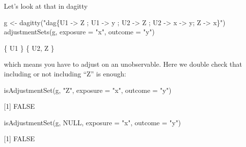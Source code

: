 \documentclass[
  11pt,
  ignorenonframetext,
]{beamer}
\newenvironment{Shaded}{\begin{snugshade}}{\end{snugshade}}
\newcommand{\AttributeTok}[1]{\textcolor[rgb]{0.40,0.45,0.13}{#1}}
\newcommand{\ConstantTok}[1]{\textcolor[rgb]{0.56,0.35,0.01}{#1}}
\newcommand{\FunctionTok}[1]{\textcolor[rgb]{0.28,0.35,0.67}{#1}}
\newcommand{\NormalTok}[1]{\textcolor[rgb]{0.00,0.23,0.31}{#1}}
\newcommand{\OtherTok}[1]{\textcolor[rgb]{0.00,0.23,0.31}{#1}}
\newcommand{\StringTok}[1]{\textcolor[rgb]{0.13,0.47,0.30}{#1}}
\begin{document}
\begin{frame}[fragile]{Let's look at that in dagitty}
\protect\hypertarget{lets-look-at-that-in-dagitty-1}{}
\begin{Shaded}
\begin{Highlighting}[]
\NormalTok{g }\OtherTok{\textless{}{-}} \FunctionTok{dagitty}\NormalTok{(}\StringTok{"dag\{U1 {-}\textgreater{} Z  ; U1 {-}\textgreater{} y ; }
\StringTok{             U2 {-}\textgreater{} Z ; U2 {-}\textgreater{} x  {-}\textgreater{} y; }
\StringTok{             Z {-}\textgreater{} x\}"}\NormalTok{)}
\FunctionTok{adjustmentSets}\NormalTok{(g, }\AttributeTok{exposure =} \StringTok{"x"}\NormalTok{, }\AttributeTok{outcome =} \StringTok{"y"}\NormalTok{)}
\end{Highlighting}
\end{Shaded}

\{ U1 \} \{ U2, Z \}

which means you have to adjust on an unobservable. Here we double check
that including or not including ``Z'' is enough:

\begin{Shaded}
\begin{Highlighting}[]
\FunctionTok{isAdjustmentSet}\NormalTok{(g, }\StringTok{"Z"}\NormalTok{, }\AttributeTok{exposure =} \StringTok{"x"}\NormalTok{, }\AttributeTok{outcome =} \StringTok{"y"}\NormalTok{)}
\end{Highlighting}
\end{Shaded}

{[}1{]} FALSE

\begin{Shaded}
\begin{Highlighting}[]
\FunctionTok{isAdjustmentSet}\NormalTok{(g, }\ConstantTok{NULL}\NormalTok{, }\AttributeTok{exposure =} \StringTok{"x"}\NormalTok{, }\AttributeTok{outcome =} \StringTok{"y"}\NormalTok{)}
\end{Highlighting}
\end{Shaded}

{[}1{]} FALSE
\end{frame}
\end{document}
